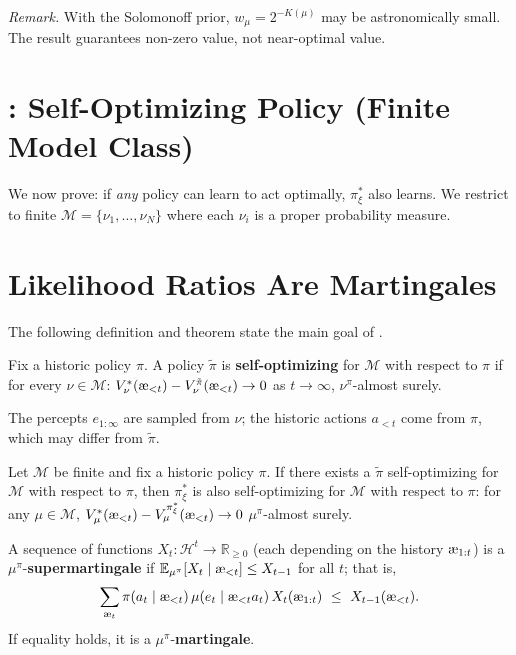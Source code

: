 \documentclass[fontsize=11pt, parskip=half]{scrartcl}
\newcommand{\cH}{\mathcal{H}}
\newcommand{\cM}{\mathcal{M}}
\newcommand{\Ex}{\mathbb{E}}
\newcommand{\aes}{\textnormal{\ae}}
\begin{document}
\textit{Remark.} With the Solomonoff prior, $w_\mu = 2^{-K(\mu)}$ may be astronomically small. The result guarantees non-zero value, not near-optimal value.


\section*{: Self-Optimizing Policy (Finite Model Class)}

We now prove: if \emph{any} policy can learn to act optimally, $\pi_\xi^*$ also learns. We restrict to finite $\cM = \{\nu_1, \ldots, \nu_N\}$ where each $\nu_i$ is a proper probability measure.

\section{Likelihood Ratios Are Martingales}\label{prob:supermartingale}

The following definition and theorem state the main goal of .

\begin{definition}\label{def:selfopt}
Fix a historic policy $\pi$. A policy $\tilde\pi$ is \textbf{self-optimizing} for $\cM$ with respect to $\pi$ if for every $\nu \in \cM$:
$V_\nu^*(\aes_{<t}) - V_\nu^{\tilde\pi}(\aes_{<t}) \to 0$ as $t \to \infty$, $\nu^\pi$-almost surely.

The percepts $e_{1:\infty}$ are sampled from $\nu$; the historic actions $a_{<t}$ come from $\pi$, which may differ from $\tilde\pi$.
\end{definition}

\begin{theorem}\label{thm:selfopt}
Let $\cM$ be finite and fix a historic policy $\pi$.
If there exists a $\tilde\pi$ self-optimizing for $\cM$ with respect to $\pi$, then $\pi_\xi^*$ is also self-optimizing for $\cM$ with respect to $\pi$: for any $\mu \in \cM$,
$V_\mu^*(\aes_{<t}) - V_\mu^{\pi_\xi^*}(\aes_{<t}) \to 0$ $\mu^\pi$-almost surely.
\end{theorem}

\begin{definition}[Supermartingale]\label{def:supermartingale}
A sequence of functions $X_t : \cH^{t} \to \mathbb{R}_{\geq 0}$ (each depending on the history $\aes_{1:t}$) is a $\mu^\pi$-\textbf{supermartingale} if
$\Ex_{\mu^\pi}[X_t \mid \aes_{<t}] \leq X_{t-1}$ for all $t$; that is,
\[
    \sum_{\aes_t} \pi(a_t \mid \aes_{<t})\, \mu(e_t \mid \aes_{<t} a_t)\, X_t(\aes_{1:t}) ~\leq~ X_{t-1}(\aes_{<t}).
\]
If equality holds, it is a $\mu^\pi$-\textbf{martingale}.
\end{definition}
\end{document}
